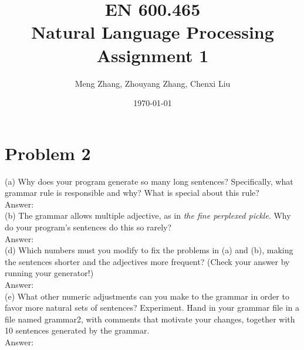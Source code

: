 \documentclass[a4paper, 11pt]{article}
\begin{document}
\date{\today}
\author{Meng Zhang, Zhouyang Zhang, Chenxi Liu }
\title{\textbf{EN 600.465 \\Natural Language Processing\\Assignment 1\\ }}

\maketitle
\section{Problem 2}
(a) Why does your program generate so many long sentences? Specifically, what grammar rule is responsible and why? What is special about this rule?\\
Answer: \\
(b) The grammar allows multiple adjective, as in \textit{the fine perplexed pickle}. Why do your program's sentences do this so rarely? \\
Answer: \\
(d) Which  numbers  must  you  modify  to  fix  the  problems  in  (a)  and  (b),  making  the  sentences shorter and the adjectives more frequent? (Check your answer by running your generator!) \\
Answer: \\
(e) What other numeric adjustments can you make to the grammar in order to favor more natural sets of sentences?  Experiment.  Hand in your grammar file in a file named grammar2, with comments that motivate your changes, together with 10 sentences generated by the grammar. \\
Answer: \\




\end{document}
